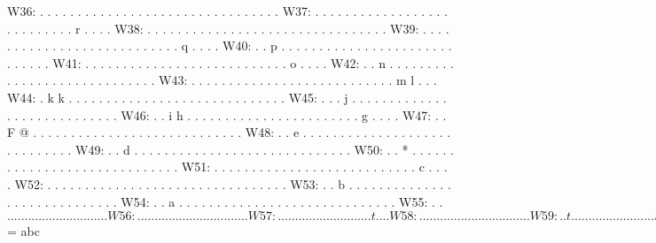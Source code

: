 \begingroup
\fontsize{8pt}{9pt}\selectfont
\begin{verbbox}
W36:	 . . . . . . . . . . . . . . . . . . . . . . . . . . . . . . . .
W37:	 . . . . . . . . . . . . . . . . . . . . . . . . . . . r . . . .
W38:	 . . . . . . . . . . . . . . . . . . . . . . . . . . . . . . . .
W39:	 . . . . . . . . . . . . . . . . . . . . . . . . . . . q . . . .
W40:	 . . p . . . . . . . . . . . . . . . . . . . . . . . . . . . . .
W41:	 . . . . . . . . . . . . . . . . . . . . . . . . . . . o . . . .
W42:	 . . n . . . . . . . . . . . . . . . . . . . . . . . . . . . . .
W43:	 . . . . . . . . . . . . . . . . . . . . . . . . . . . m l . . .
W44:	 . k k . . . . . . . . . . . . . . . . . . . . . . . . . . . . .
W45:	 . . . j . . . . . . . . . . . . . . . . . . . . . . . . . . . .
W46:	 . . i h . . . . . . . . . . . . . . . . . . . . . . . g . . . .
W47:	 . . F @ . . . . . . . . . . . . . . . . . . . . . . . . . . . .
W48:	 . . e . . . . . . . . . . . . . . . . . . . . . . . . . . . . .
W49:	 . . d . . . . . . . . . . . . . . . . . . . . . . . . . . . . .
W50:	 . . * . . . . . . . . . . . . . . . . . . . . . . . . . . . . .
W51:	 . . . . . . . . . . . . . . . . . . . . . . . . . . . c . . . .
W52:	 . . . . . . . . . . . . . . . . . . . . . . . . . . . . . . . .
W53:	 . . b . . . . . . . . . . . . . . . . . . . . . . . . . . . . .
W54:	 . . a . . . . . . . . . . . . . . . . . . . . . . . . . . . . .
W55:	 . . $ . . . . . . . . . . . . . . . . . . . . . . . . . . . . .
W56:	 . . . . . . . . . . . . . . . . . . . . . . . . . . . . . . . .
W57:	 . . . . . . . . . . . . . . . . . . . . . . . . . . . t . . . .
W58:	 . . . . . . . . . . . . . . . . . . . . . . . . . . . . . . . .
W59:	 . . t . . . . . . . . . . . . . . . . . . . . . . . . s . . . .
W60:	 . . . . . . . . . . . . . . . . . . . . . . . . . . . . . . . .
W61:	 . . . . . . . . . . . . . . . . . . . . . . . . . . . . . . . .
W62:	 . . . . . . . . . . . . . . . . . . . . . . . . . . . . . . . .
W63:	 . . s . . . . . . . . . . . . . . . . . . . . . . . . . . . . .
W64:	 . . . . . . . . . . . . . . . . . . . . . . . . . . . . . . . .
W65:	 . . . . . . . . . . . . . . . . . . . . . . . . . . . . . . . .
W66:	 . . . . . . . . . . . . . . . . . . . . . . . . . . . . . . . .
W67:	 . . . . . . . . . . . . . . . . . . . . . . . . . . . . . . . .
W68:	 . . . . . . . . . . . . . . . . . . . . . . . . . . . . . . . .
W69:	 . . . . . . . . . . . . . . . . . . . . . . . . . . . . . . . .
W70:	 . . . . . . . . . . . . . . . . . . . . . . . . . . . . . . . w
W71:	 . . . . . . . . . . . . . . . . . . . . . . . . . . v . . . . .
W72:	 . . . . . . . . . . . . . . . . . . . . . . . . . . . . . . . .
W73:	 . . . . . . . . . . . . . . . . . . . . . . . . . . . . . . u .
W74:	 . . . . . . . . . . . . . . . . . . . . . . . . . U . . . . . 1
W75:	 . %

@ = fhIjlMNopQr
* = deg
$ = abc
\end{verbbox}
\endgroup

